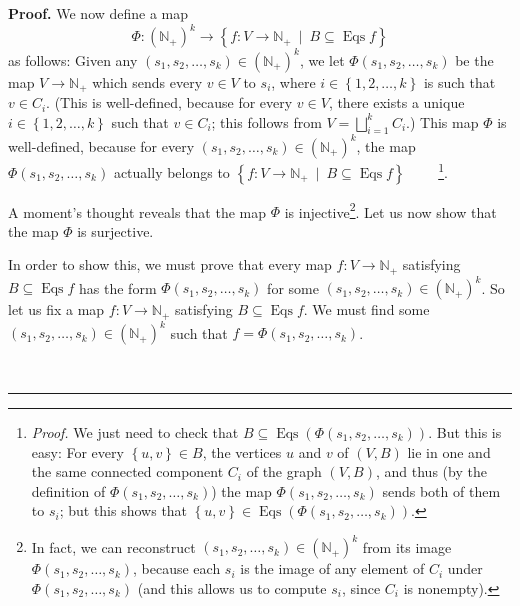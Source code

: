 \documentclass[numbers=enddot,12pt,final,onecolumn,notitlepage]{scrartcl}%
\theoremstyle{definition}
\newenvironment{proof}[1][Proof]{\noindent\textbf{#1.} }{\ \rule{0.5em}{0.5em}}
\newenvironment{vershort}{}{}
\begin{document}
\begin{vershort}
\begin{proof}
We now define a map%
\[
\Phi:\left(  \mathbb{N}_{+}\right)  ^{k}\rightarrow\left\{  f:V\rightarrow
\mathbb{N}_{+}\ \mid\ B\subseteq\operatorname*{Eqs}f\right\}
\]
as follows: Given any $\left(  s_{1},s_{2},\ldots,s_{k}\right)  \in\left(
\mathbb{N}_{+}\right)  ^{k}$, we let $\Phi\left(  s_{1},s_{2},\ldots
,s_{k}\right)  $ be the map $V\rightarrow\mathbb{N}_{+}$ which sends every
$v\in V$ to $s_{i}$, where $i\in\left\{  1,2,\ldots,k\right\}  $ is such that
$v\in C_{i}$. (This is well-defined, because for every $v\in V$, there exists
a unique $i\in\left\{  1,2,\ldots,k\right\}  $ such that $v\in C_{i}$; this
follows from $V=\bigsqcup_{i=1}^{k}C_{i}$.) This map $\Phi$ is well-defined,
because for every $\left(  s_{1},s_{2},\ldots,s_{k}\right)  \in\left(
\mathbb{N}_{+}\right)  ^{k}$, the map $\Phi\left(  s_{1},s_{2},\ldots
,s_{k}\right)  $ actually belongs to $\left\{  f:V\rightarrow\mathbb{N}%
_{+}\ \mid\ B\subseteq\operatorname*{Eqs}f\right\}  $%
\ \ \ \ \footnote{\textit{Proof.} We just need to check that $B\subseteq
\operatorname*{Eqs}\left(  \Phi\left(  s_{1},s_{2},\ldots,s_{k}\right)
\right)  $. But this is easy: For every $\left\{  u,v\right\}  \in B$, the
vertices $u$ and $v$ of $\left(  V,B\right)  $ lie in one and the same
connected component $C_{i}$ of the graph $\left(  V,B\right)  $, and thus (by
the definition of $\Phi\left(  s_{1},s_{2},\ldots,s_{k}\right)  $) the map
$\Phi\left(  s_{1},s_{2},\ldots,s_{k}\right)  $ sends both of them to $s_{i}$;
but this shows that $\left\{  u,v\right\}  \in\operatorname*{Eqs}\left(
\Phi\left(  s_{1},s_{2},\ldots,s_{k}\right)  \right)  $.}.

A moment's thought reveals that the map $\Phi$ is injective\footnote{In fact,
we can reconstruct $\left(  s_{1},s_{2},\ldots,s_{k}\right)  \in\left(
\mathbb{N}_{+}\right)  ^{k}$ from its image $\Phi\left(  s_{1},s_{2}%
,\ldots,s_{k}\right)  $, because each $s_{i}$ is the image of any element of
$C_{i}$ under $\Phi\left(  s_{1},s_{2},\ldots,s_{k}\right)  $ (and this allows
us to compute $s_{i}$, since $C_{i}$ is nonempty).}. Let us now show that the
map $\Phi$ is surjective.

In order to show this, we must prove that every map $f:V\rightarrow
\mathbb{N}_{+}$ satisfying $B\subseteq\operatorname*{Eqs}f$ has the form
$\Phi\left(  s_{1},s_{2},\ldots,s_{k}\right)  $ for some $\left(  s_{1}%
,s_{2},\ldots,s_{k}\right)  \in\left(  \mathbb{N}_{+}\right)  ^{k}$. So let us
fix a map $f:V\rightarrow\mathbb{N}_{+}$ satisfying $B\subseteq
\operatorname*{Eqs}f$. We must find some $\left(  s_{1},s_{2},\ldots
,s_{k}\right)  \in\left(  \mathbb{N}_{+}\right)  ^{k}$ such that
$f=\Phi\left(  s_{1},s_{2},\ldots,s_{k}\right)  $.


\end{proof}
\end{vershort}
\end{document}

